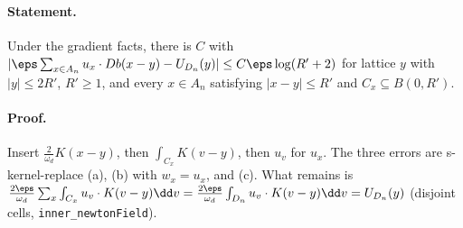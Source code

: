 \paragraph{Statement.} Under the gradient facts, there is $C$ with $|\eps\sum_{x\in A_n}u_x\cdot Db(x-y)-U_{D_n}(y)|\leq C\eps\log(R'+2)$ for lattice
$y$ with $|y|\leq2R'$, $R'\geq1$, and every $x\in A_n$ satisfying $|x-y|\leq R'$ and $C_x\subseteq B(0,R')$.
\paragraph{Proof.} Insert $\frac2{\omega_d}K(x-y)$, then $\int_{C_x}K(v-y)$, then $u_v$ for $u_x$. The three errors are s-kernel-replace (a), (b)
with $w_x=u_x$, and (c). What remains is $\frac{2\eps}{\omega_d}\sum_x\int_{C_x}u_v\cdot K(v-y)\dd v=\frac{2\eps}{\omega_d}\int_{D_n}u_v\cdot K(v-y)\dd v=U_{D_n}(y)$
(disjoint cells, \texttt{inner\_newtonField}).
